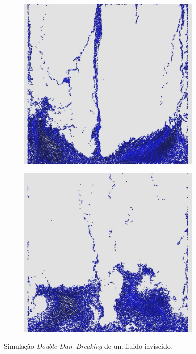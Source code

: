 \documentclass[12pt,a4paper,dvipsnames]{article}
\begin{document}
\begin{figure}[!ht]
\begin{subfigure}[!h]{0.3\textwidth}
	\end{subfigure}
	\begin{subfigure}[!h]{0.3\textwidth} \centering
		\includegraphics[width=\textwidth]{DDB/DDB-10.jpg}
	\end{subfigure}
	\begin{subfigure}[!h]{0.3\textwidth} \centering
		\includegraphics[width=\textwidth]{DDB/DDB-11.jpg}
	\end{subfigure}
    \caption{Simulação \textit{Double Dam Breaking} de um fluido invíscido.}
    \label{fig:doubledb}
\end{figure}
\end{document}
